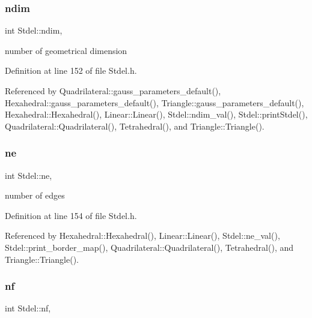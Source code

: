 \mbox{\label{classStdel_a912f36b591d847eed2531a3b3a51a520}} 
\subsubsection{\texorpdfstring{ndim}{ndim}}
{\footnotesize\ttfamily int Stdel\+::ndim\hspace{0.3cm}{\ttfamily [protected]}, {\ttfamily [inherited]}}



number of geometrical dimension 



Definition at line 152 of file Stdel.\+h.



Referenced by Quadrilateral\+::gauss\+\_\+parameters\+\_\+default(), Hexahedral\+::gauss\+\_\+parameters\+\_\+default(), Triangle\+::gauss\+\_\+parameters\+\_\+default(), Hexahedral\+::\+Hexahedral(), Linear\+::\+Linear(), Stdel\+::ndim\+\_\+val(), Stdel\+::print\+Stdel(), Quadrilateral\+::\+Quadrilateral(), Tetrahedral(), and Triangle\+::\+Triangle().

\mbox{\label{classStdel_aef3d1b34184b9fd03c0b655640c243b6}} 
\subsubsection{\texorpdfstring{ne}{ne}}
{\footnotesize\ttfamily int Stdel\+::ne\hspace{0.3cm}{\ttfamily [protected]}, {\ttfamily [inherited]}}



number of edges 



Definition at line 154 of file Stdel.\+h.



Referenced by Hexahedral\+::\+Hexahedral(), Linear\+::\+Linear(), Stdel\+::ne\+\_\+val(), Stdel\+::print\+\_\+border\+\_\+map(), Quadrilateral\+::\+Quadrilateral(), Tetrahedral(), and Triangle\+::\+Triangle().

\mbox{\label{classStdel_a61987080026986a40412a8937aad4b24}} 
\subsubsection{\texorpdfstring{nf}{nf}}
{\footnotesize\ttfamily int Stdel\+::nf\hspace{0.3cm}{\ttfamily [protected]}, {\ttfamily [inherited]}}



